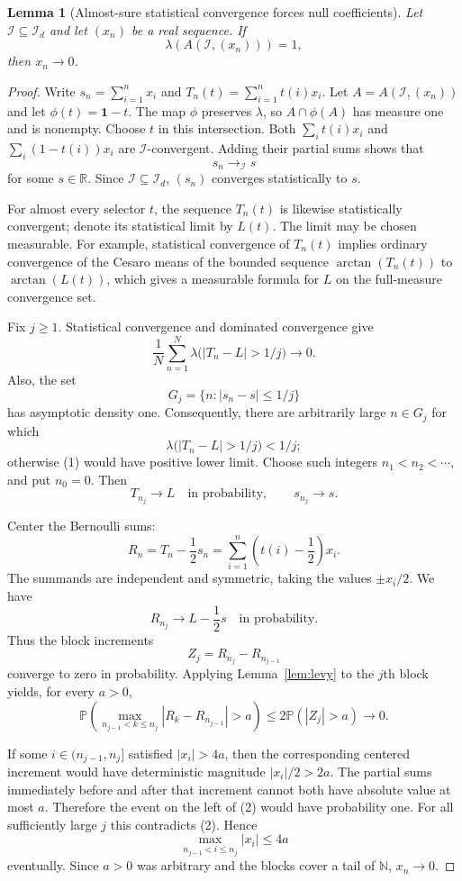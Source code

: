 \documentclass[11pt]{article}
\newtheorem{lemma}{Lemma}
\newcommand{\N}{\mathbb N}
\newcommand{\R}{\mathbb R}
\newcommand{\cI}{\mathcal I}
\newcommand{\Id}{\mathcal I_d}
\newcommand{\Prob}{\mathbb P}
\begin{document}
\begin{lemma}[Almost-sure statistical convergence forces null coefficients]
\label{lem:null}
Let $\cI\subseteq\Id$ and let $(x_n)$ be a real sequence.  If
\[
 \lambda(A(\cI,(x_n)))=1,
\]
then $x_n\to0$.
\end{lemma}

\begin{proof}
Write $s_n=\sum_{i=1}^n x_i$ and
$T_n(t)=\sum_{i=1}^n t(i)x_i$.  Let $A=A(\cI,(x_n))$ and let
$\phi(t)=\boldsymbol{1}-t$.  The map $\phi$ preserves $\lambda$, so
$A\cap\phi(A)$ has measure one and is nonempty.  Choose $t$ in this
intersection.  Both $\sum_i t(i)x_i$ and $\sum_i(1-t(i))x_i$ are
$\cI$-convergent.  Adding their partial sums shows that
\[
 s_n\longrightarrow_{\cI}s
\]
for some $s\in\R$.  Since $\cI\subseteq\Id$, $(s_n)$ converges statistically
to $s$.

For almost every selector $t$, the sequence $T_n(t)$ is likewise
statistically convergent; denote its statistical limit by $L(t)$.  The limit
may be chosen measurable.  For example, statistical convergence of $T_n(t)$
implies ordinary convergence of the Cesaro means of the bounded sequence
$\arctan(T_n(t))$ to $\arctan(L(t))$, which gives a measurable formula for
$L$ on the full-measure convergence set.

Fix $j\geq1$.  Statistical convergence and dominated convergence give
\[
 \frac1N\sum_{n=1}^N
 \lambda\bigl(|T_n-L|>1/j\bigr)\longrightarrow0.
 \tag{1}
\]
Also, the set
\[
 G_j=\{n:|s_n-s|\leq1/j\}
\]
has asymptotic density one.  Consequently, there are arbitrarily large
$n\in G_j$ for which
\[
 \lambda\bigl(|T_n-L|>1/j\bigr)<1/j;
\]
otherwise (1) would have positive lower limit.  Choose such integers
 $n_1<n_2<\cdots$, and put $n_0=0$.  Then
\[
 T_{n_j}\longrightarrow L\quad\text{in probability},
 \qquad s_{n_j}\longrightarrow s.
\]

Center the Bernoulli sums:
\[
 R_n=T_n-\frac12s_n
     =\sum_{i=1}^n\left(t(i)-\frac12\right)x_i.
\]
The summands are independent and symmetric, taking the values
$\pm x_i/2$.  We have
\[
 R_{n_j}\longrightarrow L-\frac12s
 \quad\text{in probability}.
\]
Thus the block increments
\[
 Z_j=R_{n_j}-R_{n_{j-1}}
\]
converge to zero in probability.  Applying
Lemma~\ref{lem:levy} to the $j$th block yields, for every $a>0$,
\[
 \Prob\!\left(
  \max_{n_{j-1}<k\leq n_j}|R_k-R_{n_{j-1}}|>a
 \right)
 \leq2\Prob(|Z_j|>a)\longrightarrow0.
 \tag{2}
\]

If some $i\in(n_{j-1},n_j]$ satisfied $|x_i|>4a$, then the corresponding
centered increment would have deterministic magnitude $|x_i|/2>2a$.
The partial sums immediately before and after that increment cannot both
have absolute value at most $a$.  Therefore the event on the left of (2)
would have probability one.  For all sufficiently large $j$ this contradicts
(2).  Hence
\[
 \max_{n_{j-1}<i\leq n_j}|x_i|\leq4a
\]
eventually.  Since $a>0$ was arbitrary and the blocks cover a tail of $\N$,
$x_n\to0$.
\end{proof}
\end{document}

